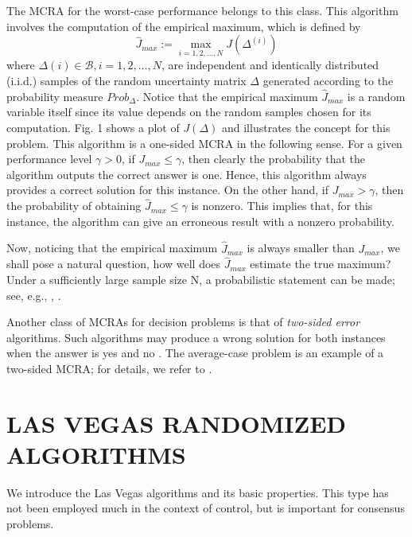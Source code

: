 \documentclass[12pt]{article}
\begin{document}
		
		The MCRA for the worst-case performance belongs to this class. This algorithm involves the computation of the empirical maximum, which is defined by 
		\begin{equation*} 	
			\hat{J}_{max}:= \max_{i=1, 2, ..., N}J(\Delta ^{(i)}) 
		\end{equation*}
		where $
		\Delta (i) \in \mathscr{B} , i=1,2,...,N$, are independent and identically distributed (i.i.d.) samples of the random uncertainty matrix $\Delta$ generated according to the probability measure $Prob_{\Delta }$. Notice that the empirical maximum $\hat{J}_{max}$ is a random variable itself since its value depends on the random samples chosen for its computation. Fig. 1 shows a plot of $J(\Delta)$ and illustrates the concept for this problem. This algorithm is a one-sided MCRA in the following sense. For a given performance level $\gamma > 0$, if $J_{max}\leq \gamma $, then clearly the probability that the algorithm outputs the correct answer is one. Hence, this algorithm always provides a correct solution for this instance. On the other hand, if $J_{max}>
		\gamma $, then the probability of obtaining $\hat{J}_{max}\leq\gamma $ is nonzero. This implies that, for this instance, the algorithm can give an erroneous result with a nonzero probability.
		\par
		Now, noticing that the empirical maximum $\hat{J}_{max}$ is always smaller than $J_{max}$, we shall pose a natural question, how well does $\hat{J}_{max}$ estimate the true maximum? Under a sufficiently large sample size N, a probabilistic statement can be made; see, e.g., \cite{bib22}, \cite{bib23}.
		\par
		Another class of MCRAs for decision problems is that of 
		\textit{two-sided error} algorithms. Such algorithms may produce a wrong solution for both instances when the answer is yes and no \cite{bib17}. The average-case problem is an example of a two-sided MCRA; for details, we refer to \cite{bib24}.
		
		
		\section{LAS VEGAS RANDOMIZED ALGORITHMS}
		We introduce the Las Vegas algorithms and its basic properties. This type has not been employed much in the context of control, but is important for consensus problems.
		\par
		
		
\end{document}
